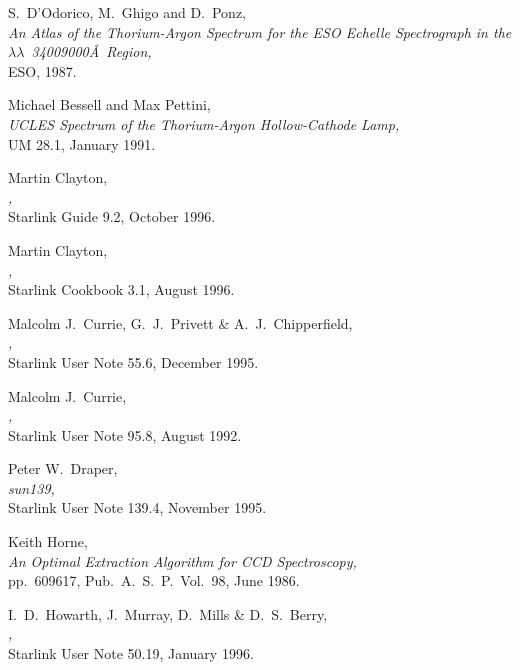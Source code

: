 {{\begin{thebibliography}{999}
 S.~D'Odorico, M.~Ghigo and D.~Ponz,\\
      {\sl An Atlas of the Thorium-Argon Spectrum for the ESO Echelle
      Spectrograph in the $\lambda\lambda$~3400\scspec{--}{-}9000\AA\ Region,}\\
      ESO, 1987.

 Michael Bessell and Max Pettini,\\
      {\sl UCLES Spectrum of the Thorium-Argon Hollow-Cathode Lamp,}\\
       UM 28.1, January 1991.

 Martin Clayton,\\
      {\sl {},}\\
      Starlink Guide 9.2, October 1996.

 Martin Clayton,\\
      {\sl {},}\\
      Starlink Cookbook 3.1, August 1996.

 Malcolm J.~Currie, G.~J.~Privett \& A.~J.~Chipperfield,\\
      {\sl {},}\\
      Starlink User Note 55.6, December 1995.

 Malcolm J.~Currie,\\
      {\sl {},}\\
      Starlink User Note 95.8, August 1992.

 Peter W.~Draper,\\
      {\sl {}
      {sun139}{},}\\
      Starlink User Note 139.4, November 1995.

 Keith Horne,\\
      {\sl An Optimal Extraction Algorithm for CCD Spectroscopy,}\\
      pp.~609\scspec{--}{-}617, Pub.~A.~S.~P.~Vol.~98, June 1986.

 I.~D.~Howarth, J.~Murray, D.~Mills \& D.~S.~Berry,\\
      {\sl {},}\\
      Starlink User Note 50.19, January 1996.


\end{thebibliography}}}
